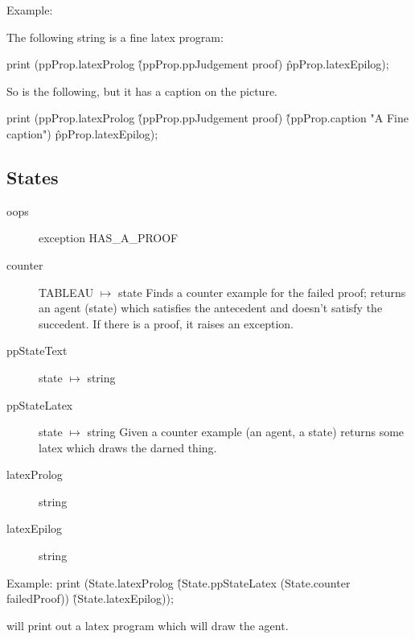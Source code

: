 \documentclass[12pt]{article}
\begin{document}
Example:

The following string is a fine latex program:

print (ppProp.latexProlog \^ (ppProp.ppJudgement proof) \^ ppProp.latexEpilog);

So is the following, but it has a caption on the picture.

print (ppProp.latexProlog \^ (ppProp.ppJudgement proof) \^
		(ppProp.caption "A Fine caption") \^ ppProp.latexEpilog);



\subsection{States}

\begin{description}
\item[oops]  exception HAS\_A\_PROOF
\item[counter] TABLEAU $\mapsto$ state
	Finds a counter example for the failed proof;
	returns an agent (state) which satisfies the antecedent and doesn't
	satisfy the succedent.  If there is a proof, it raises an exception.
\item[ppStateText] state $\mapsto$ string
\item[ppStateLatex] state $\mapsto$ string
		Given a counter example (an agent, a state) returns
		some latex which draws the darned thing.
\item[latexProlog] string
\item[latexEpilog] string
\end{description}


Example:
print (State.latexProlog \^ (State.ppStateLatex (State.counter failedProof))
	\^ (State.latexEpilog));

will print out a latex program which will draw the agent.
\end{document}
